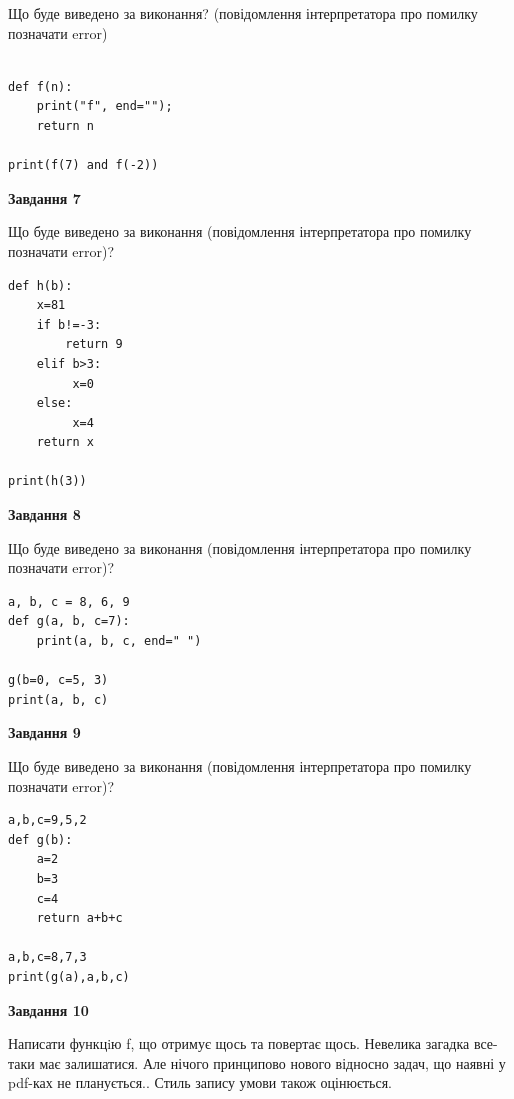 \documentclass[12pt, ukrainian]{article}
\begin{document}
{\begin {large}
Що буде виведено за виконання? (повідомлення інтерпретатора про помилку позначати error)\par
\begin{verbatim}

def f(n):
    print("f", end="");
    return n

print(f(7) and f(-2))
\end{verbatim}

{\begin {center}\textbf{Завдання 7}\end {center}}

Що буде виведено за виконання (повідомлення інтерпретатора про помилку позначати error)?\par
\begin{verbatim}
def h(b):
    x=81
    if b!=-3: 
        return 9
    elif b>3:
         x=0
    else:
         x=4
    return x

print(h(3))
\end{verbatim}

{\begin {center}\textbf{Завдання 8}\end {center}}

Що буде виведено за виконання (повідомлення інтерпретатора про помилку позначати error)?\par
\begin{verbatim}
a, b, c = 8, 6, 9
def g(a, b, c=7):
    print(a, b, c, end=" ")

g(b=0, c=5, 3)
print(a, b, c)
\end{verbatim}

{\begin {center}\textbf{Завдання 9}\end {center}}

Що буде виведено за виконання (повідомлення інтерпретатора про помилку позначати error)?\par
\begin{verbatim}
a,b,c=9,5,2
def g(b):
    a=2
    b=3
    c=4
    return a+b+c

a,b,c=8,7,3
print(g(a),a,b,c)
\end{verbatim}

{\begin {center}\textbf{Завдання 10}\end {center}}


Написати функцiю f, що отримує щось та повертає щось. Невелика загадка все-таки має залишатися. Але нічого принципово нового відносно задач, що наявні у pdf-ках не планується.. Стиль запису умови також оцінюється.\par
\end {large}}
\newpage
\end{document}
